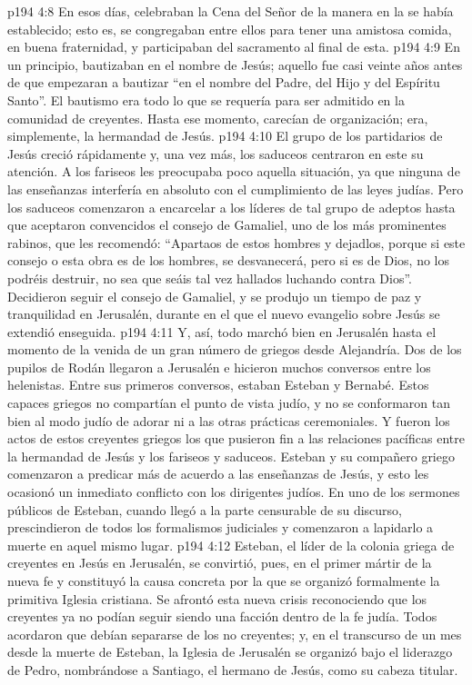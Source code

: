 \vs p194 4:8 \pc En esos días, celebraban la Cena del Señor de la manera en la se había establecido; esto es, se congregaban entre ellos para tener una amistosa comida, en buena fraternidad, y participaban del sacramento al final de esta.
\vs p194 4:9 \pc En un principio, bautizaban en el nombre de Jesús; aquello fue casi veinte años antes de que empezaran a bautizar “en el nombre del Padre, del Hijo y del Espíritu Santo”. El bautismo era todo lo que se requería para ser admitido en la comunidad de creyentes. Hasta ese momento, carecían de organización; era, simplemente, la hermandad de Jesús.
\vs p194 4:10 \pc El grupo de los partidarios de Jesús creció rápidamente y, una vez más, los saduceos centraron en este su atención. A los fariseos les preocupaba poco aquella situación, ya que ninguna de las enseñanzas interfería en absoluto con el cumplimiento de las leyes judías. Pero los saduceos comenzaron a encarcelar a los líderes de tal grupo de adeptos hasta que aceptaron convencidos el consejo de Gamaliel, uno de los más prominentes rabinos, que les recomendó: “Apartaos de estos hombres y dejadlos, porque si este consejo o esta obra es de los hombres, se desvanecerá, pero si es de Dios, no los podréis destruir, no sea que seáis tal vez hallados luchando contra Dios”. Decidieron seguir el consejo de Gamaliel, y se produjo un tiempo de paz y tranquilidad en Jerusalén, durante en el que el nuevo evangelio sobre Jesús se extendió enseguida.
\vs p194 4:11 Y, así, todo marchó bien en Jerusalén hasta el momento de la venida de un gran número de griegos desde Alejandría. Dos de los pupilos de Rodán llegaron a Jerusalén e hicieron muchos conversos entre los helenistas. Entre sus primeros conversos, estaban Esteban y Bernabé. Estos capaces griegos no compartían el punto de vista judío, y no se conformaron tan bien al modo judío de adorar ni a las otras prácticas ceremoniales. Y fueron los actos de estos creyentes griegos los que pusieron fin a las relaciones pacíficas entre la hermandad de Jesús y los fariseos y saduceos. Esteban y su compañero griego comenzaron a predicar más de acuerdo a las enseñanzas de Jesús, y esto les ocasionó un inmediato conflicto con los dirigentes judíos. En uno de los sermones públicos de Esteban, cuando llegó a la parte censurable de su discurso, prescindieron de todos los formalismos judiciales y comenzaron a lapidarlo a muerte en aquel mismo lugar.
\vs p194 4:12 Esteban, el líder de la colonia griega de creyentes en Jesús en Jerusalén, se convirtió, pues, en el primer mártir de la nueva fe y constituyó la causa concreta por la que se organizó formalmente la primitiva Iglesia cristiana. Se afrontó esta nueva crisis reconociendo que los creyentes ya no podían seguir siendo una facción dentro de la fe judía. Todos acordaron que debían separarse de los no creyentes; y, en el transcurso de un mes desde la muerte de Esteban, la Iglesia de Jerusalén se organizó bajo el liderazgo de Pedro, nombrándose a Santiago, el hermano de Jesús, como su cabeza titular.
